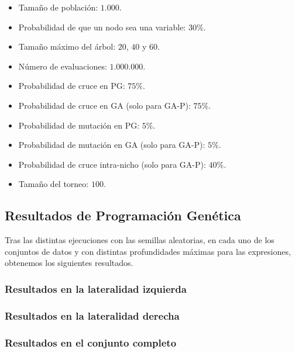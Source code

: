 \begin{itemize}
	\item Tamaño de población: $1.000$.
	\item Probabilidad de que un nodo sea una variable: $30\%$.
	\item Tamaño máximo del árbol: $20$, $40$ y $60$.
	\item Número de evaluaciones: $1.000.000$.
	\item Probabilidad de cruce en PG: $75\%$.
	\item Probabilidad de cruce en GA (solo para GA-P): $75\%$.
	\item Probabilidad de mutación en PG: $5\%$.
	\item Probabilidad de mutación en GA (solo para GA-P): $5\%$.
	\item Probabilidad de cruce intra-nicho (solo para GA-P): $40\%$.
	\item Tamaño del torneo: $100$.
\end{itemize}

\newpage

\subsection{Resultados de Programación Genética}

Tras las distintas ejecuciones con las semillas aleatorias, en cada uno de los conjuntos de datos y con distintas profundidades máximas para las expresiones, obtenemos los siguientes resultados.


\subsubsection{Resultados en la lateralidad izquierda}



\subsubsection{Resultados en la lateralidad derecha}




\subsubsection{Resultados en el conjunto completo}



